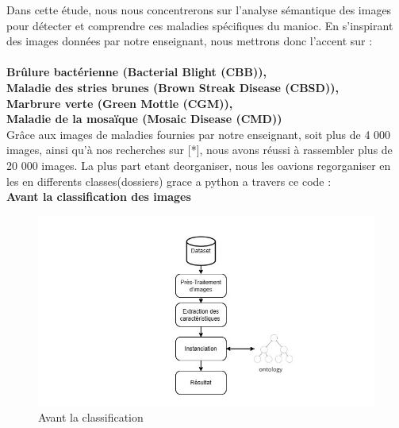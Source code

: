 \documentclass{article}
\begin{document}
		Dans cette étude, nous nous concentrerons sur l'analyse sémantique des images pour détecter et comprendre ces maladies spécifiques du manioc. En s'inspirant des images données par notre enseignant, nous mettrons donc l'accent sur : \\ \\
		\textemdash \textbf{ Brûlure bactérienne (Bacterial Blight (CBB)), } \\
		\textemdash \textbf{ Maladie des stries brunes (Brown Streak Disease (CBSD)), } \\
		\textemdash \textbf{ Marbrure verte (Green Mottle (CGM)), } \\
		\textemdash \textbf{ Maladie de la mosaïque (Mosaic Disease (CMD)) } \\
		
		Grâce aux images de maladies fournies par notre enseignant, soit plus de 4 000 images,
		ainsi qu'à nos recherches sur [*], nous avons réussi à rassembler plus de 20 000 images.
		La plus part etant deorganiser, nous les oavions regorganiser en les en differents classes(dossiers) grace a python a travers ce code : \\
		
		\textbf{Avant la classification des images}
		\begin{figure}[htbp]
			\begin{center}
				\begin{minipage}[b]{0.7\textwidth}
					\centering
					\includegraphics[width=\textwidth]{img/14.png}
					\caption{Avant la classification}
				\end{minipage}
			\end{center}
		\end{figure}
		
\end{document}
